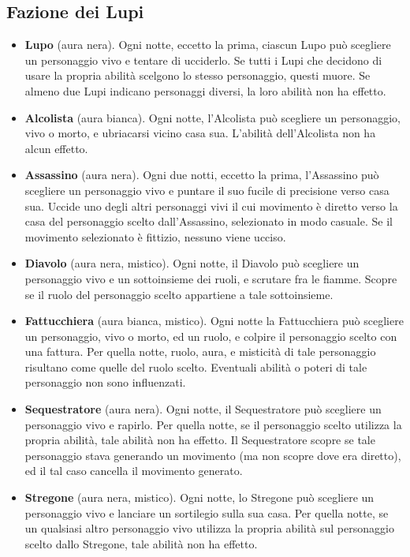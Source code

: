 \documentclass[a4paper,10pt]{article}
\begin{document}
\subsection*{Fazione dei Lupi}

\begin{itemize}
	
	\item {\bf Lupo} (aura nera). Ogni notte, eccetto la prima, ciascun Lupo può scegliere un personaggio vivo e tentare di ucciderlo. Se tutti i Lupi che decidono di usare la propria abilità scelgono lo stesso personaggio, questi muore. Se almeno due Lupi indicano personaggi diversi, la loro abilità non ha effetto.
	
	\item {\bf Alcolista} (aura bianca). Ogni notte, l'Alcolista può scegliere un personaggio, vivo o morto, e ubriacarsi vicino casa sua. L'abilità dell'Alcolista non ha alcun effetto.
	
	\item {\bf Assassino} (aura nera). Ogni due notti, eccetto la prima, l'Assassino può scegliere un personaggio vivo e puntare il suo fucile di precisione verso casa sua. Uccide uno degli altri personaggi vivi il cui movimento è diretto verso la casa del personaggio scelto dall'Assassino, selezionato in modo casuale. Se il movimento selezionato è fittizio, nessuno viene ucciso.

	\item {\bf Diavolo} (aura nera, mistico). Ogni notte, il Diavolo può scegliere un personaggio vivo e un sottoinsieme dei ruoli, e scrutare fra le fiamme. Scopre se il ruolo del personaggio scelto appartiene a tale sottoinsieme.
 
	\item {\bf Fattucchiera} (aura bianca, mistico). Ogni notte la Fattucchiera può scegliere un personaggio, vivo o morto, ed un ruolo, e colpire il personaggio scelto con una fattura. Per quella notte, ruolo, aura, e misticità di tale personaggio risultano come quelle del ruolo scelto. Eventuali abilità o poteri di tale personaggio non sono influenzati.

	\item {\bf Sequestratore} (aura nera). Ogni notte, il Sequestratore può scegliere un personaggio vivo e rapirlo. Per quella notte, se il personaggio scelto utilizza la propria abilità, tale abilità non ha effetto. Il Sequestratore scopre se tale personaggio stava generando un movimento (ma non scopre dove era diretto), ed il tal caso cancella il movimento generato.
	
	\item {\bf Stregone} (aura nera, mistico). Ogni notte, lo Stregone può scegliere un personaggio vivo e lanciare un sortilegio sulla sua casa. Per quella notte, se un qualsiasi altro personaggio vivo utilizza la propria abilità sul personaggio scelto dallo Stregone, tale abilità non ha effetto.
 
\end{itemize}
\end{document}
